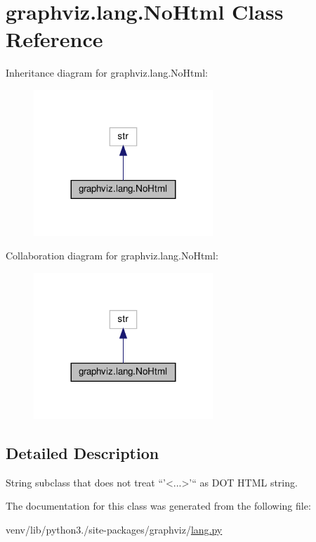 \hypertarget{classgraphviz_1_1lang_1_1NoHtml}{}\section{graphviz.\+lang.\+No\+Html Class Reference}
\label{classgraphviz_1_1lang_1_1NoHtml}


Inheritance diagram for graphviz.\+lang.\+No\+Html\+:
\nopagebreak
\begin{figure}[H]
\begin{center}
\leavevmode
\includegraphics[width=191pt]{classgraphviz_1_1lang_1_1NoHtml__inherit__graph}
\end{center}
\end{figure}


Collaboration diagram for graphviz.\+lang.\+No\+Html\+:
\nopagebreak
\begin{figure}[H]
\begin{center}
\leavevmode
\includegraphics[width=191pt]{classgraphviz_1_1lang_1_1NoHtml__coll__graph}
\end{center}
\end{figure}


\subsection{Detailed Description}
\begin{DoxyVerb}String subclass that does not treat ``'<...>'`` as DOT HTML string.\end{DoxyVerb}
 

The documentation for this class was generated from the following file\+:\begin{DoxyCompactItemize}
\item 
venv/lib/python3./site-\/packages/graphviz/\hyperlink{lang_8py}{lang.\+py}\end{DoxyCompactItemize}
